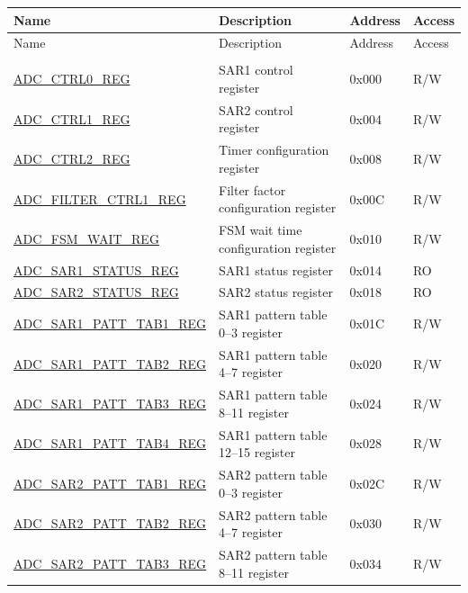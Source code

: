 \begin{longtable}{ | p{} | p{} | p{} | p{} | }
\hline\rowcolor{lightgray}
Name & Description & Address & Access \\ \hline
\endfirsthead
\hline
\rowcolor{lightgray}
Name & Description & Address & Access\\
\hline
\endhead
\endfoot

\multicolumn{4}{|l|}{\textbf{Configuration Registers}} \\ \hline
\hyperref[regdesc:ADCCTRL0REG]{ADC\_CTRL0\_REG} & SAR1 control register & 0x000 & R/W \\\hline
\hyperref[regdesc:ADCCTRL1REG]{ADC\_CTRL1\_REG} & SAR2 control register & 0x004 & R/W \\\hline
\hyperref[regdesc:ADCCTRL2REG]{ADC\_CTRL2\_REG} & Timer configuration register & 0x008 & R/W \\\hline
\hyperref[regdesc:ADCFILTERCTRL1REG]{ADC\_FILTER\_CTRL1\_REG} & Filter factor configuration register & 0x00C & R/W \\\hline
\hyperref[regdesc:ADCFSMWAITREG]{ADC\_FSM\_WAIT\_REG} & FSM wait time configuration register & 0x010 & R/W \\\hline
\hyperref[regdesc:ADCSAR1STATUSREG]{ADC\_SAR1\_STATUS\_REG} & SAR1 status register & 0x014 & RO \\\hline
\hyperref[regdesc:ADCSAR2STATUSREG]{ADC\_SAR2\_STATUS\_REG} & SAR2 status register & 0x018 & RO \\\hline
\hyperref[regdesc:ADCSAR1PATTTAB1REG]{ADC\_SAR1\_PATT\_TAB1\_REG} & SAR1 pattern table 0--3 register & 0x01C & R/W \\\hline
\hyperref[regdesc:ADCSAR1PATTTAB2REG]{ADC\_SAR1\_PATT\_TAB2\_REG} & SAR1 pattern table 4--7 register & 0x020 & R/W \\\hline
\hyperref[regdesc:ADCSAR1PATTTAB3REG]{ADC\_SAR1\_PATT\_TAB3\_REG} & SAR1 pattern table 8--11 register & 0x024 & R/W \\\hline
\hyperref[regdesc:ADCSAR1PATTTAB4REG]{ADC\_SAR1\_PATT\_TAB4\_REG} & SAR1 pattern table 12--15 register & 0x028 & R/W \\\hline
\hyperref[regdesc:ADCSAR2PATTTAB1REG]{ADC\_SAR2\_PATT\_TAB1\_REG} & SAR2 pattern table 0--3 register & 0x02C & R/W \\\hline
\hyperref[regdesc:ADCSAR2PATTTAB2REG]{ADC\_SAR2\_PATT\_TAB2\_REG} & SAR2 pattern table 4--7 register & 0x030 & R/W \\\hline
\hyperref[regdesc:ADCSAR2PATTTAB3REG]{ADC\_SAR2\_PATT\_TAB3\_REG} & SAR2 pattern table 8--11 register & 0x034 & R/W \\\hline

\end{longtable}
